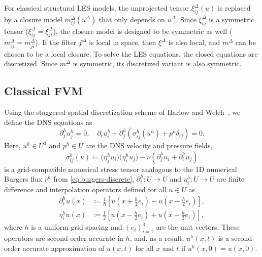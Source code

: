 \documentclass[preprint,twocolumn,5p]{elsarticle}
\begin{document}
For classical structural LES models, the unprojected tensor
$\xi^\Delta_{i j}(u)$ is
replaced by a closure model $m^\Delta_{i j}(\bar{u}^\Delta)$
that only depends on $\bar{u}^\Delta$.
Since $\xi^\Delta_{i j}$ is a symmetric tensor ($\xi^\Delta_{i j} = \xi^\Delta_{j i}$),
the closure model is designed to be symmetric as well ($m^\Delta_{i j} = m^\Delta_{j i}$).
If the filter $f^\Delta$ is local in space,
then $\xi^\Delta$ is also local, and $m^\Delta$ can be chosen to be a local
closure.
To solve the LES equations, the closed equations are discretized.
Since $m^\Delta$ is symmetric, its discretized variant is also symmetric.

\subsection{Classical FVM}

Using the staggered spatial discretization scheme of Harlow and
Welch~\cite{harlowNumericalCalculationTimeDependent1965},
we define the DNS equations as
\begin{equation} \label{eq:ns-dns}
    \partial^h_j u^h_j = 0, \quad
    \partial_t u^h_i
    + \partial^h_j \left( \sigma^h_{i j}\left(u^h\right) + p^h \delta_{i j} \right)
    = 0.
\end{equation}
Here, $u^h \in U^3$ and $p^h \in U$ are the DNS velocity and pressure fields,
\begin{equation}
    \sigma^h_{i j}(u) \coloneq \Big(\eta^h_j u_i\Big) \Big(\eta^h_i u_j\Big) -
    \nu \left(\partial^h_j u_i + \partial^h_i u_j\right)
\end{equation}
is a grid-compatible numerical stress tensor
analogous to the 1D numerical Burgers flux $r^h$
from \cref{eq:burgers-discrete},
$\partial^h_i : U \to U$ and $\eta^h_i : U \to U$ are finite difference and
interpolation operators defined for all $u \in U$ as
\begin{align}
    \partial^h_i u(x) & \coloneq
    \frac{1}{h} \left[
        u\left(x + \frac{h}{2} e_i\right) -
        u\left(x - \frac{h}{2} e_i\right)
    \right], \\
    \eta^h_i u(x) & \coloneq
    \frac{1}{2} \left[
        u\left(x - \frac{h}{2} e_i\right) +
        u\left(x + \frac{h}{2} e_i\right)
    \right],
    \label{eq:eta}
\end{align}
where $h$ is a uniform grid spacing and $(e_i)_{i = 1}^3$ are the unit vectors.
These operators are second-order accurate in $h$, and, as a result,
$u^h(x, t)$ is a second-order accurate approximation of $u(x, t)$
for all $x$ and $t$ if $u^h(x, 0) = u(x, 0)$.
\end{document}
